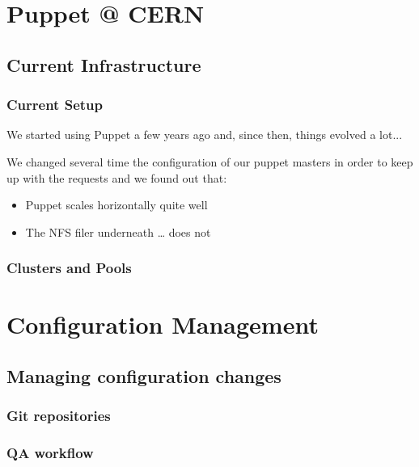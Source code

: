 \documentclass[aspectratio=169]{beamer}
\begin{document}
\section{Puppet @ CERN}

\subsection{Current Infrastructure}
\begin{frame}
    \frametitle{Current Setup}
    We started using Puppet a few years ago and, since then, things evolved a lot...

    We changed several time the configuration of our puppet masters in order to keep up with the requests and we found out that:

    \begin{itemize}
        \item Puppet scales horizontally quite well
        \item The NFS filer underneath … does not
    \end{itemize}
\end{frame}


\begin{frame}
    \frametitle{Clusters and Pools}
\end{frame}

\section{Configuration Management}

\subsection{Managing configuration changes}
\begin{frame}
    \frametitle{Git repositories}
\end{frame}


\begin{frame}
    \frametitle{QA workflow}
\end{frame}

\end{document}
